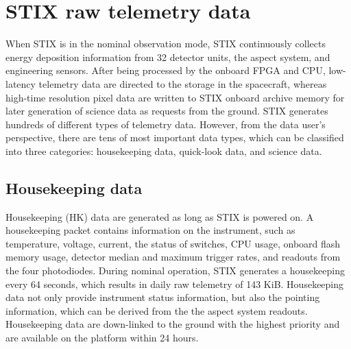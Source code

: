 \documentclass[referee]{aa} %
\begin{document}
\section{STIX raw telemetry data}
\label{sec:raw-data}
When STIX  is in the nominal observation mode, STIX continuously collects energy deposition information from 32 detector units, the aspect system,
and engineering sensors.
After being processed by the onboard FPGA and CPU,  
low-latency telemetry data are directed to the
storage in the spacecraft,  whereas high-time resolution pixel data are written to STIX onboard archive memory for 
later generation of science data as requests from the ground. 
STIX generates hundreds of different types of telemetry data. 
However, from the data user's perspective, 
there are tens of most important data types, which can be classified into three categories:
 housekeeping data, quick-look data, and science data.
\subsection{Housekeeping data}
Housekeeping (HK) data are generated as long as STIX is powered on.
A housekeeping packet contains information on the instrument,  such as temperature,
voltage, current, the status of switches, CPU usage, onboard flash memory usage, 
detector median and maximum trigger rates, and readouts from the four photodiodes.
During nominal operation, STIX generates a housekeeping every 64 seconds, which 
results in daily raw telemetry of  143 KiB.
Housekeeping data not only provide instrument status information, but also 
the pointing information, which can be derived from the the aspect system readouts. 
Housekeeping data are down-linked to the ground with the highest priority and are available on the platform
within 24 hours. 
\end{document}
